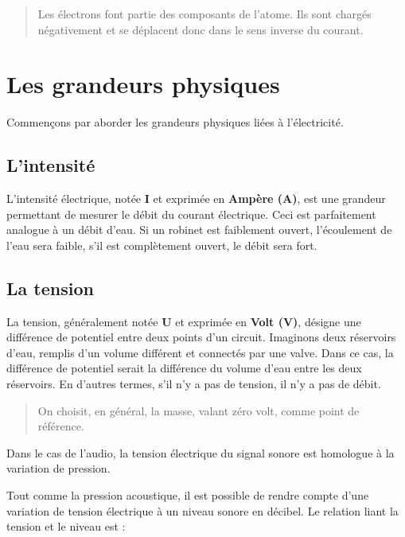 \documentclass[
]{book}
\begin{document}
\begin{quote}
Les électrons font partie des composants de l'atome. Ils sont chargés négativement et se déplacent donc dans le sens inverse du courant.
\end{quote}

\hypertarget{les-grandeurs-physiques}{%
\section{Les grandeurs physiques}\label{les-grandeurs-physiques}}

Commençons par aborder les grandeurs physiques liées à l'électricité.

\hypertarget{lintensituxe9}{%
\subsection{L'intensité}\label{lintensituxe9}}

L'intensité électrique, notée \textbf{I} et exprimée en \textbf{Ampère (A)}, est une grandeur permettant de mesurer le débit du courant électrique. Ceci est parfaitement analogue à un débit d'eau. Si un robinet est faiblement ouvert, l'écoulement de l'eau sera faible, s'il est complètement ouvert, le débit sera fort.

\hypertarget{la-tension}{%
\subsection{La tension}\label{la-tension}}

La tension, généralement notée \textbf{U} et exprimée en \textbf{Volt (V)}, désigne une différence de potentiel entre deux points d'un circuit. Imaginons deux réservoirs d'eau, remplis d'un volume différent et connectés par une valve. Dans ce cas, la différence de potentiel serait la différence du volume d'eau entre les deux réservoirs. En d'autres termes, s'il n'y a pas de tension, il n'y a pas de débit.

\begin{quote}
On choisit, en général, la masse, valant zéro volt, comme point de référence.
\end{quote}

Dans le cas de l'audio, la tension électrique du signal sonore est homologue à la variation de pression.

Tout comme la pression acoustique, il est possible de rendre compte d'une variation de tension électrique à un niveau sonore en décibel. Le relation liant la tension et le niveau est :
\end{document}
